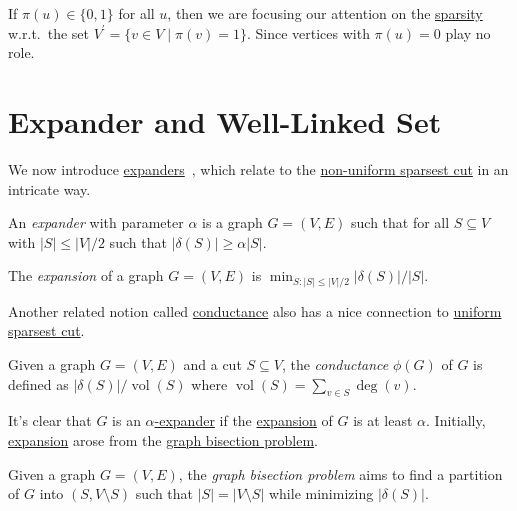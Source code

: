 \begin{remark}
	If \(\pi (u) \in \{ 0, 1 \} \) for all \(u\), then we are focusing our attention on the \hyperref[def:sparsity]{sparsity} w.r.t.\ the set \(V^{\prime} = \{ v \in V \mid \pi (v) = 1 \} \). Since vertices with \(\pi (u) = 0\) play no role.
\end{remark}

\section{Expander and Well-Linked Set}
We now introduce \hyperref[def:expander]{expanders}~\cite{hoory2006expander}, which relate to the \hyperref[prb:non-uniform-sparsest-cut]{non-uniform sparsest cut} in an intricate way.

\begin{definition}[Expander]\label{def:expander}
	An \emph{expander} with parameter \(\alpha \) is a graph \(G = (V, E)\) such that for all \(S \subseteq V\) with \(\lvert S \rvert \leq \lvert V \rvert / 2\) such that \(\lvert \delta (S) \rvert \geq \alpha \lvert S \rvert\).
\end{definition}

\begin{definition}[Expansion]\label{def:expansion}
	The \emph{expansion} of a graph \(G = (V, E)\) is \(\min _{S\colon \lvert S \rvert \leq \lvert V \rvert / 2} \lvert \delta (S) \rvert / \lvert S \rvert \).
\end{definition}

Another related notion called \hyperref[def:conductance]{conductance} also has a nice connection to \hyperref[prb:sparsest-cut]{uniform sparsest cut}.

\begin{definition}[Conductance]\label{def:conductance}
	Given a graph \(G = (V, E)\) and a cut \(S \subseteq V\), the \emph{conductance} \(\phi (G)\) of \(G\) is defined as \(\lvert \delta (S) \rvert / \operatorname{vol}(S) \) where \(\operatorname{vol}(S) = \sum_{v \in S} \deg(v)\).
\end{definition}

It's clear that \(G\) is an \hyperref[def:expander]{\(\alpha \)-expander} if the \hyperref[def:expansion]{expansion} of \(G\) is at least \(\alpha \). Initially, \hyperref[def:expansion]{expansion} arose from the \hyperref[prb:graph-bisection]{graph bisection problem}.

\begin{problem}\label{prb:graph-bisection}
Given a graph \(G = (V, E)\), the \emph{graph bisection problem} aims to find a partition of \(G\) into \((S, V \setminus S)\) such that \(\lvert S \rvert = \lvert V \setminus S \rvert \) while minimizing \(\lvert \delta (S) \rvert \).
\end{problem}

